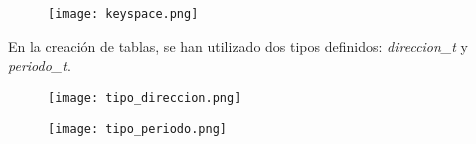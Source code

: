 \documentclass[a4paper]{article}
\begin{document}
\begin{figure}[H]
    \centering
    \texttt{[image: keyspace.png]}
    \label{fig:keyspace}
\end{figure}

En la creación de tablas, se han utilizado dos tipos definidos: \emph{direccion\_t} y \emph{periodo\_t}.

\begin{figure}[H]
    \centering
    \begin{minipage}[c]{0.4\textwidth}
        \centering
        \texttt{[image: tipo\_direccion.png]}
    \end{minipage}
    \begin{minipage}[c]{0.4\textwidth}
        \centering
        \texttt{[image: tipo\_periodo.png]}
    \end{minipage}
    \label{fig:tipos}
\end{figure}
\end{document}
